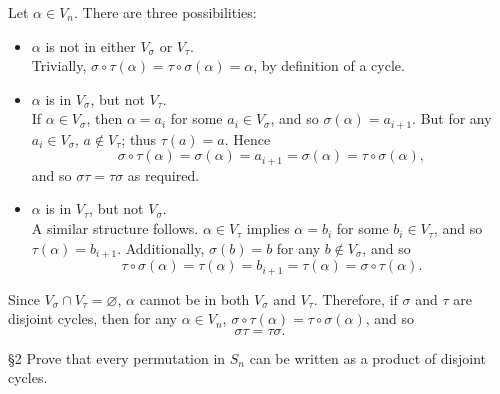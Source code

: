 \documentclass{homework}
\begin{document}
\begin{solution}
\begin{enumerate}[label=(\alph*)]
      Let $ \alpha\in V_n$. There are three possibilities:
      \begin{itemize}
        \item $\alpha$ is not in either $V_\sigma$ or $V_\tau$.\\
          Trivially, $\sigma\circ \tau(\alpha)=\tau\circ \sigma(\alpha)=\alpha$, by definition of a cycle.
        \item $\alpha$ is in $V_\sigma$, but not $V_\tau$.\\
          If $\alpha\in V_\sigma$, then $\alpha=a_i$ for some $a_i\in V_\sigma$, and so
          $\sigma(\alpha)=a_{i+1}$. But for any $a_i\in V_\sigma$, $a\not\in V_\tau$; thus
          $\tau(a)=a$. Hence \[
            \sigma\circ \tau(\alpha)=\sigma(\alpha)=a_{i+1}=\sigma(\alpha)=\tau\circ \sigma(\alpha)
          ,\]  and so $\sigma\tau=\tau\sigma$ as required.
        \item $\alpha$ is in $V_\tau$, but not $V_\sigma$.\\
          A similar structure follows. $\alpha\in V_\tau$ implies $\alpha=b_i$ for some $b_i\in
          V_\tau$, and so $\tau(\alpha)=b_{i+1}$. Additionally, $\sigma(b)=b$ for any $b\not\in
          V_\sigma$, and so \[
            \tau\circ \sigma(\alpha)=\tau(\alpha)=b_{i+1}=\tau(\alpha)=\sigma\circ \tau(\alpha)
          .\] 
      \end{itemize}
      Since $V_\sigma\cap V_\tau=\varnothing$, $\alpha$ cannot be in both $V_\sigma$ and $V_\tau$.
      Therefore, if $ \sigma$ and $\tau$ are disjoint cycles, then for any $ \alpha\in V_n$,
      $\sigma\circ \tau(\alpha)=\tau\circ \sigma(\alpha)$, and so \[
        \sigma\tau=\tau\sigma
      .\] 
  \end{enumerate}
\end{solution}


\begin{problem}{\S 2}
  Prove that every permutation in $S_n$ can be written as a product of disjoint cycles.
\end{problem}
\end{document}
